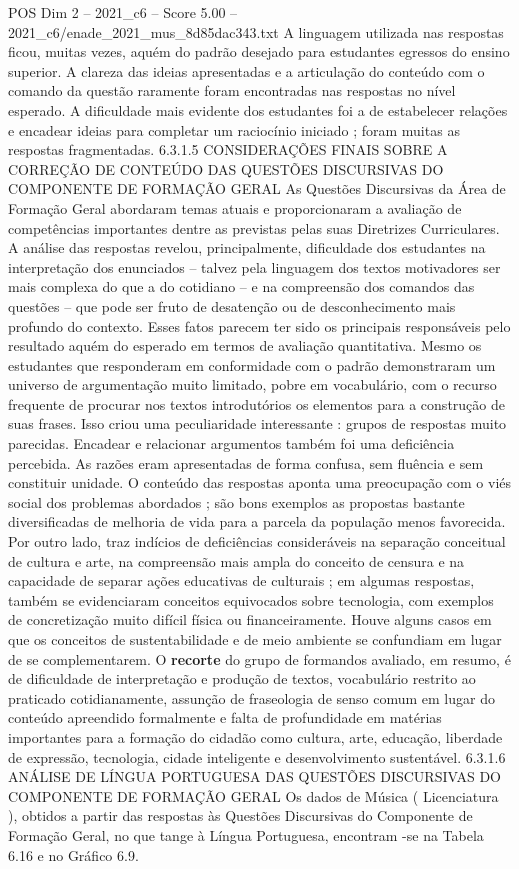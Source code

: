 \begin{textsample}{POS Dim 2 – 2021\_c6 – Score 5.00 – 2021\_c6/enade\_2021\_mus\_8d85dac343.txt}
A linguagem utilizada nas respostas ficou, muitas vezes, aquém do padrão desejado para estudantes egressos do ensino superior.
A clareza das ideias apresentadas e a articulação do conteúdo com o comando da questão raramente foram encontradas nas respostas no nível esperado.
A dificuldade mais evidente dos estudantes foi a de estabelecer relações e encadear ideias para completar um raciocínio iniciado ; foram muitas as respostas fragmentadas. 6.3.1.5 CONSIDERAÇÕES FINAIS SOBRE A CORREÇÃO DE CONTEÚDO DAS QUESTÕES DISCURSIVAS DO COMPONENTE DE FORMAÇÃO GERAL As Questões Discursivas da Área de Formação Geral abordaram temas atuais e proporcionaram a avaliação de competências importantes dentre as previstas pelas suas Diretrizes Curriculares.
A análise das respostas revelou, principalmente, dificuldade dos estudantes na interpretação dos enunciados – talvez pela linguagem dos textos motivadores ser mais complexa do que a do cotidiano – e na compreensão dos comandos das questões – que pode ser fruto de desatenção ou de desconhecimento mais profundo do contexto.
Esses fatos parecem ter sido os principais responsáveis pelo resultado aquém do esperado em termos de avaliação quantitativa.
Mesmo os estudantes que responderam em conformidade com o padrão demonstraram um universo de argumentação muito limitado, pobre em vocabulário, com o recurso frequente de procurar nos textos introdutórios os elementos para a construção de suas frases.
Isso criou uma peculiaridade interessante : grupos de respostas muito parecidas.
Encadear e relacionar argumentos também foi uma deficiência percebida.
As razões eram apresentadas de forma confusa, sem fluência e sem constituir unidade.
O conteúdo das respostas aponta uma preocupação com o viés social dos problemas abordados ; são bons exemplos as propostas bastante diversificadas de melhoria de vida para a parcela da população menos favorecida.
Por outro lado, traz indícios de deficiências consideráveis na separação conceitual de cultura e arte, na compreensão mais ampla do conceito de censura e na capacidade de separar ações educativas de culturais ; em algumas respostas, também se evidenciaram conceitos equivocados sobre tecnologia, com exemplos de concretização muito difícil física ou financeiramente.
Houve alguns casos em que os conceitos de sustentabilidade e de meio ambiente se confundiam em lugar de se complementarem.
O \textbf{recorte} do grupo de formandos avaliado, em resumo, é de dificuldade de interpretação e produção de textos, vocabulário restrito ao praticado cotidianamente, assunção de fraseologia de senso comum em lugar do conteúdo apreendido formalmente e falta de profundidade em matérias importantes para a formação do cidadão como cultura, arte, educação, liberdade de expressão, tecnologia, cidade inteligente e desenvolvimento sustentável. 6.3.1.6 ANÁLISE DE LÍNGUA PORTUGUESA DAS QUESTÕES DISCURSIVAS DO COMPONENTE DE FORMAÇÃO GERAL Os dados de Música ( Licenciatura ), obtidos a partir das respostas às Questões Discursivas do Componente de Formação Geral, no que tange à Língua Portuguesa, encontram -se na Tabela 6.16 e no Gráfico 6.9.

\end{textsample}
